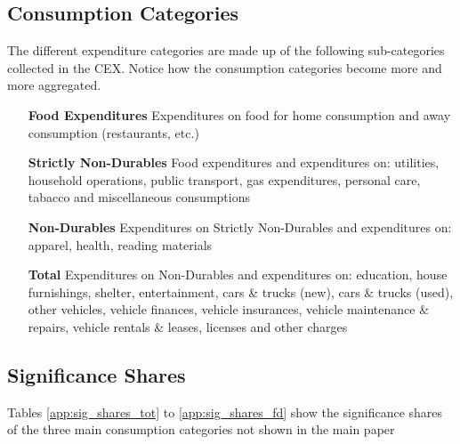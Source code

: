 \subsection{Consumption Categories}\label{app:c_cats}
The different expenditure categories are made up of the following sub-categories collected in the CEX. Notice how the consumption categories become more and more aggregated.
\begin{itemize}[leftmargin=70pt, rightmargin=40pt]
    \item[\textbf{Food Expenditures}] Expenditures on food for home consumption and away consumption (restaurants, etc.)
    \item[\textbf{Strictly Non-Durables}] Food expenditures and expenditures on: utilities, household operations, public transport, gas expenditures, personal care, tabacco and miscellaneous consumptions
    \item[\textbf{Non-Durables}] Expenditures on Strictly Non-Durables and expenditures on: apparel, health, reading materials
    \item[\textbf{Total}] Expenditures on Non-Durables and expenditures on: education, house furnishings, shelter, entertainment, cars \& trucks (new), cars \& trucks (used), other vehicles, vehicle finances, vehicle insurances, vehicle maintenance \& repairs, vehicle rentals \& leases, licenses and other charges
\end{itemize}

\subsection{Significance Shares} \label{app:sig_shares}
Tables \ref{app:sig_shares_tot} to \ref{app:sig_shares_fd} show the significance shares of the three main consumption categories not shown in the main paper


